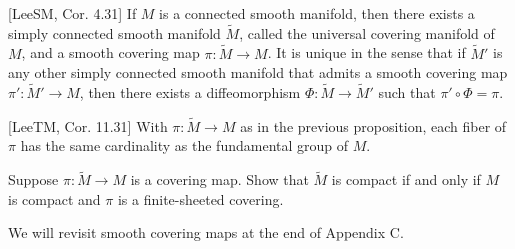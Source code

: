 \begin{proposition}
\label{prop:universal-covering-manifold}
[LeeSM, Cor. 4.31] If $M$ is a connected smooth manifold, then there exists a simply connected smooth manifold $\tilde{M}$, called the universal covering manifold of $M$, and a smooth covering map $\pi: \tilde{M} \to M$. It is unique in the sense that if $\tilde{M}'$ is any other simply connected smooth manifold that admits a smooth covering map $\pi': \tilde{M}' \to M$, then there exists a diffeomorphism $\Phi: \tilde{M} \to \tilde{M}'$ such that $\pi' \circ \Phi = \pi$.
\end{proposition}

\begin{proposition}
\label{prop:fiber-cardinality-fundamental-group}
[LeeTM, Cor. 11.31] With $\pi: \tilde{M} \to M$ as in the previous proposition, each fiber of $\pi$ has the same cardinality as the fundamental group of $M$.
\end{proposition}

\begin{exercise}
\label{exer:A.62}
Suppose $\pi: \tilde{M} \to M$ is a covering map. Show that $\tilde{M}$ is compact if and only if $M$ is compact and $\pi$ is a finite-sheeted covering.
\end{exercise}

We will revisit smooth covering maps at the end of Appendix C.
